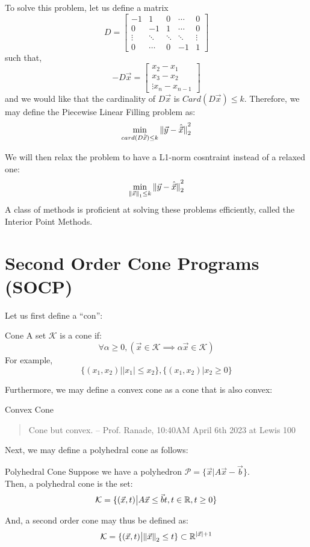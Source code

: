 To solve this problem, let us define a matrix
\[
    D =
    \begin{bmatrix}
        -1 & 1 & 0 & \cdots & 0 \\
        0 & -1 & 1 & \cdots & 0 \\
        \vdots & \ddots & \ddots & \ddots & \vdots \\
        0 & \cdots & 0 & -1 & 1
    \end{bmatrix}
\]
such that,
\[
    -D \vec{x} =
    \begin{bmatrix}
        x_2 - x_1 \\
        x_3 - x_2 \\
        \vdots
        x_n - x_{n - 1}
    \end{bmatrix}
\]
and we would like that the cardinality of $D \vec{x}$ is $Card(D \vec{x}) \leq k$.
Therefore, we may define the Piecewise Linear Filling problem as:
\[
    \min_{card(D \hat{\vec{x}}) \leq k}
    \pnorm[2]{\vec{y} - \hat{\vec{x}}}{2}
\]

We will then relax the problem to have a L1-norm cosntraint instead of a relaxed one:
\[
    \min_{\pnorm{\vec{x}}{1} \leq k}
    \pnorm[2]{\vec{y} - \hat{\vec{x}}}{2}
\]
A class of methods is proficient at solving these problems efficiently, called the Interior Point Methods.

\section{Second Order Cone Programs (SOCP)}
Let us first define a ``con'':
\begin{ln-define}{Cone}{}
    A set $\mathcal{K}$ is a cone if:
    \[
        \forall \alpha \geq 0, (\vec{x} \in \mathcal{K} \implies \alpha \vec{x} \in \mathcal{K})
    \]
    For example,
    \[
        \{ (x_1, x_2) \big| |x_1| \leq x_2 \}, \{ (x_1, x_2) \big| x_2 \geq 0 \}
    \]
\end{ln-define}
Furthermore, we may define a convex cone as a cone that is also convex:
\begin{ln-define}{Convex Cone}{}
    \begin{quote}
        Cone but convex. -- Prof. Ranade, 10:40AM April 6th 2023 at Lewis 100
    \end{quote}
\end{ln-define}
Next, we may define a polyhedral cone as follows:
\begin{ln-define}{Polyhedral Cone}{}
    Suppose we have a polyhedron $\mathcal{P} = \{ \vec{x} \big| A \vec{x} - \vec{b}\}$. \\
    Then, a polyhedral cone is the set:
    \[
        \mathcal{K} = \{
            (\vec{x}, t) \big| A \vec{x} \leq \vec{b} t, t \in \R, t \geq 0
        \}
    \]
\end{ln-define}
And, a second order cone may thus be defined as:
\[
    \mathcal{K} = \{(\vec{x}, t) \big| \pnorm{\vec{x}}{2} \leq t \} \subset \R^{|\vec{x}| + 1}
\]

